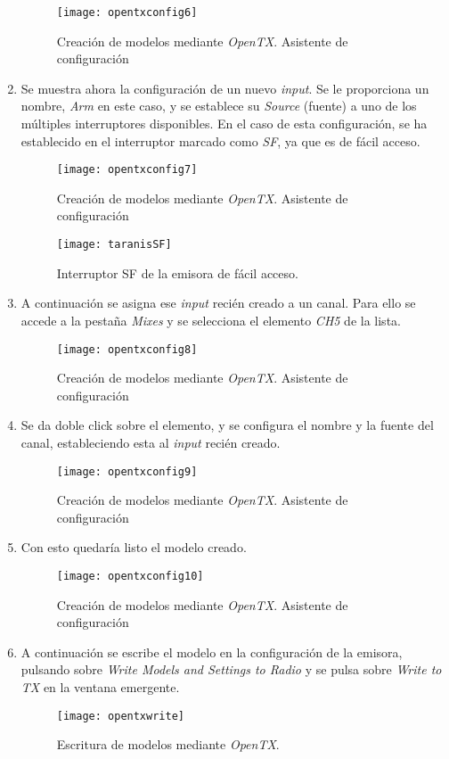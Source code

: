 \begin{enumerate}
\begin{figure}[H]
	\centering
	\texttt{[image: opentxconfig6]}
	\caption[Creación de modelos OpenTX. 6]{Creación de modelos mediante \emph{OpenTX}. Asistente de configuración}\label{fig:opentxconfig6}
\end{figure}
\item Se muestra ahora la configuración de un nuevo \emph{input}. Se le proporciona un nombre, \emph{Arm} en este caso, y se establece su \emph{Source} (fuente) a uno de los múltiples interruptores disponibles. En el caso de esta configuración, se ha establecido en el interruptor marcado como \emph{SF}, ya que es de fácil acceso.
\begin{figure}[H]
	\centering
	\texttt{[image: opentxconfig7]}
	\caption[Creación de modelos OpenTX. 7]{Creación de modelos mediante \emph{OpenTX}. Asistente de configuración}\label{fig:opentxconfig7}
\end{figure}
\begin{figure}[H]
	\centering
	\texttt{[image: taranisSF]}
	\caption[Interruptor SF de la emisora]{Interruptor SF de la emisora de fácil acceso.}\label{fig:taranisSFswitch}
\end{figure}

\item A continuación se asigna ese \emph{input} recién creado a un canal. Para ello se accede a la pestaña \emph{Mixes} y se selecciona el elemento \emph{CH5} de la lista.
\begin{figure}[H]
	\centering
	\texttt{[image: opentxconfig8]}
	\caption[Creación de modelos OpenTX. 8]{Creación de modelos mediante \emph{OpenTX}. Asistente de configuración}\label{fig:opentxconfig8}
\end{figure} 
\item Se da doble click sobre el elemento, y se configura el nombre y la fuente del canal, estableciendo esta al \emph{input} recién creado.
\begin{figure}[H]
	\centering
	\texttt{[image: opentxconfig9]}
	\caption[Creación de modelos OpenTX. 9]{Creación de modelos mediante \emph{OpenTX}. Asistente de configuración}\label{fig:opentxconfig9}
\end{figure}
\item Con esto quedaría listo el modelo creado. 
\begin{figure}[H]
	\centering
	\texttt{[image: opentxconfig10]}
	\caption[Creación de modelos OpenTX. 10]{Creación de modelos mediante \emph{OpenTX}. Asistente de configuración}\label{fig:opentxconfig10}
\end{figure}
\item A continuación se escribe el modelo en la configuración de la emisora, pulsando sobre \emph{Write Models and Settings to Radio} y se pulsa sobre \emph{Write to TX} en la ventana emergente.
\begin{figure}[H]
	\centering
	\texttt{[image: opentxwrite]}
	\caption[Escritura de modelos OpenTX.]{Escritura de modelos mediante \emph{OpenTX}.}\label{fig:opentxwrite}
\end{figure}
\end{enumerate}

